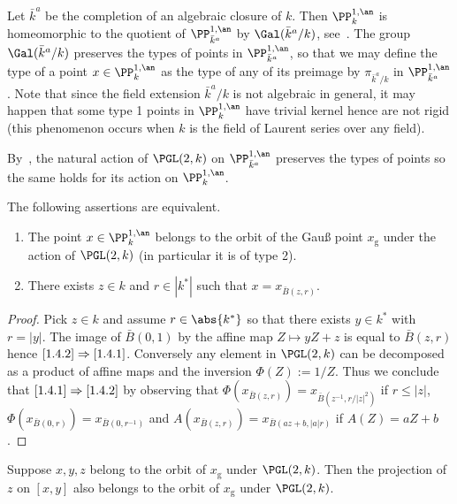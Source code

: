 Let $\bar{k}^a$ be the completion of an algebraic closure of $k$. Then $\PP^{1,\an}_{k}$ is homeomorphic to the quotient of $\PP^{1,\an}_{\bar{k}^a}$ by $\Gal(\bar{k}^a/k)$, see~\cite[Cor.~1.3.6]{berko}. The group $\Gal(\bar{k}^a/k)$ preserves the types of points in $\PP^{1,\an}_{\bar{k}^a}$, so that we may define the type of a point $x \in \PP^{1,\an}_k$ as the type of any of its preimage by $\pi_{\bar{k}^a/k}$ in $\PP^{1,\an}_{\bar{k}^a}$. Note that since the field extension $\bar{k}^a/k$ is not algebraic in general, it may happen that some type 1 points in $\PP^{1,\an}_k$ have trivial kernel hence are not rigid (this phenomenon occurs when $k$ is the field of Laurent series over any field).

By~\cite[Prop.~2.15]{baker-rumely}, the natural action of $\PGL(2, k)$ on $\PP^{1,\an}_{\bar{k}^a}$ preserves the types of points so the same holds for its action on $\PP^{1,\an}_k$.

\begin{prop}\label{prop:orbit gauss}
The following assertions are equivalent.
\begin{enumerate}
\item \label{1.4.1} The point $x\in \PP^{1,\an}_k$ belongs to the orbit of the Gau{\ss} point $x_{\mathrm{g}}$ under the action of $\PGL(2,k)$ (in particular it is of type 2).
\item \label{1.4.2} There exists $z\in k$ and $r\in |k^*|$ such that $x= x_{\bar{B}(z,r)}$.
\end{enumerate}
\end{prop}

\begin{proof}
Pick $z\in k$ and assume $r\in \abs{k^*}$ so that there exists $y\in k^*$ with $r= |y|$. The image of $\bar{B}(0,1)$ by the affine map $Z \mapsto yZ + z$ is equal to $\bar{B}(z,r)$ hence $\eqref{1.4.2}\Rightarrow\eqref{1.4.1}$. Conversely any element in $\PGL(2,k)$ can be decomposed as a product of affine maps and the inversion $\Phi(Z) := 1/Z$. Thus we conclude that $\eqref{1.4.1}\Rightarrow\eqref{1.4.2}$ by observing that $\Phi(x_{\bar{B}(z,r)})= x_{\bar{B}(z^{-1},r/|z|^2)}$ if $r \le |z|$, $\Phi(x_{\bar{B}(0,r)})= x_{\bar{B}(0,r^{-1})}$ and $A(x_{\bar{B}(z,r)}) = x_{\bar{B}(az+b, |a|r)}$ if $A(Z) = aZ +b$.
\end{proof}

\begin{prop}\label{prop:projection}
Suppose $x,y, z$ belong to the orbit of $x_{\mathrm{g}}$ under $\PGL(2,k)$. Then the projection of $z$ on $[x,y]$ also belongs to the orbit of $x_{\mathrm{g}}$ under $\PGL(2,k)$.
\end{prop}


